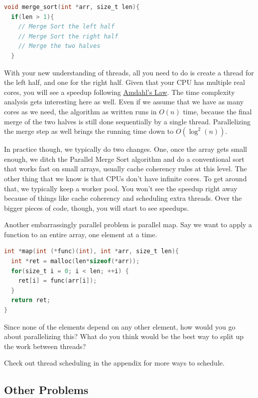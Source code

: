 \begin{lstlisting}[language=C]
void merge_sort(int *arr, size_t len){
  if(len > 1){
    // Merge Sort the left half
    // Merge Sort the right half
    // Merge the two halves
  }
\end{lstlisting}

With your new understanding of threads, all you need to do is create a thread for the left half, and one for the right half.
Given that your CPU has multiple real cores, you will see a speedup following \href{https://en.wikipedia.org/wiki/Amdahl's_law}{Amdahl's Law}.
The time complexity analysis gets interesting here as well.
Even if we assume that we have as many cores as we need, the algorithm as written runs in $O(n)$ time, because the final merge of the two halves is still done sequentially by a single thread.
Parallelizing the merge step as well brings the running time down to $O(\log^2(n))$.

In practice though, we typically do two changes.
One, once the array gets small enough, we ditch the Parallel Merge Sort algorithm and do a conventional sort that works fast on small arrays, usually cache coherency rules at this level.
The other thing that we know is that CPUs don't have infinite cores.
To get around that, we typically keep a worker pool.
You won't see the speedup right away because of things like cache coherency and scheduling extra threads.
Over the bigger pieces of code, though, you will start to see speedups.

Another embarrassingly parallel problem is parallel map.
Say we want to apply a function to an entire array, one element at a time.

\begin{lstlisting}[language=C]
int *map(int (*func)(int), int *arr, size_t len){
  int *ret = malloc(len*sizeof(*arr));
  for(size_t i = 0; i < len; ++i) {
    ret[i] = func(arr[i]);
  }
  return ret;
}
\end{lstlisting}

Since none of the elements depend on any other element, how would you go about parallelizing this?
What do you think would be the best way to split up the work between threads?

Check out thread scheduling in the appendix for more ways to schedule.

\subsection{Other Problems}

